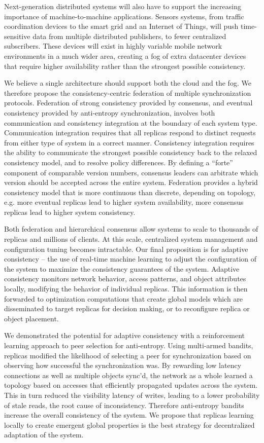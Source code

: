 Next-generation distributed systems will also have to support the increasing importance of machine-to-machine applications.
Sensors systems, from traffic coordination devices to the smart grid and an Internet of Things, will push time-sensitive data from multiple distributed publishers, to fewer centralized subscribers.
These devices will exist in highly variable mobile network environments in a much wider area, creating a fog of extra datacenter devices that require higher availability rather than the strongest possible consistency.

We believe a single architecture should support both the cloud and the fog.
We therefore propose the consistency-centric federation of multiple synchronization protocols.
Federation of strong consistency provided by consensus, and eventual consistency provided by anti-entropy synchronization, involves both communication and consistency integration at the boundary of each system type.
Communication integration requires that all replicas respond to distinct requests from either type of system in a correct manner.
Consistency integration requires the ability to communicate the strongest possible consistency back to the relaxed consistency model, and to resolve policy differences.
By defining a ``forte'' component of comparable version numbers, consensus leaders can arbitrate which version should be accepted across the entire system.
Federation provides a hybrid consistency model that is more continuous than discrete, depending on topology, e.g. more eventual replicas lead to higher system availability, more consensus replicas lead to higher system consistency.

Both federation and hierarchical consensus allow systems to scale to thousands of replicas and millions of clients.
At this scale, centralized system management and configuration tuning becomes intractable.
Our final proposition is for adaptive consistency -- the use of real-time machine learning to adjust the configuration of the system to maximize the consistency guarantees of the system.
Adaptive consistency monitors network behavior, access patterns, and object attributes locally, modifying the behavior of individual replicas.
This information is then forwarded to optimization computations that create global models which are disseminated to target replicas for decision making, or to reconfigure replica or object placement.

We demonstrated the potential for adaptive consistency with a reinforcement learning approach to peer selection for anti-entropy.
Using multi-armed bandits, replicas modified the likelihood of selecting a peer for synchronization based on observing how successful the synchronization was.
By rewarding low latency connections as well as multiple objects sync'd, the network as a whole learned a topology based on accesses that efficiently propagated updates across the system.
This in turn reduced the visibility latency of writes, leading to a lower probability of stale reads, the root cause of inconsistency.
Therefore anti-entropy bandits increase the overall consistency of the system.
We propose that replicas learning locally to create emergent global properties is the best strategy for decentralized adaptation of the system.

